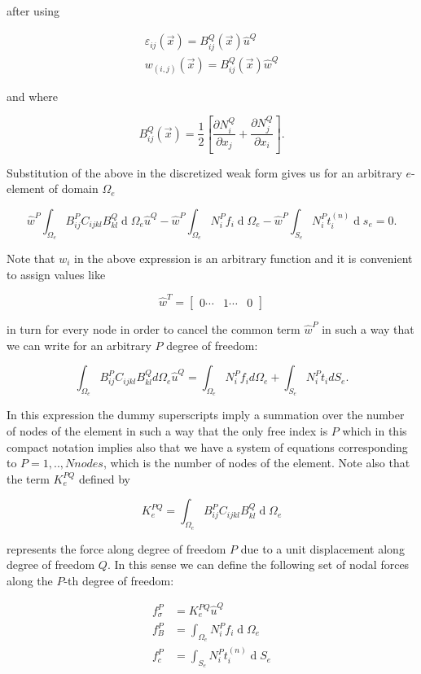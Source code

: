 after using

\begin{align*} 
\varepsilon_{ij}(\overrightarrow x)=B_{ij}^Q(\overrightarrow x)\widehat u^Q \\ 
w_{(i,j)}(\overrightarrow x)=B_{ij}^Q(\overrightarrow x)\widehat w^Q
\end{align*}


and where

\[ B_{ij}^Q(\overrightarrow x)=\frac12\left[\frac{\partial N_i^Q}{\partial x_j}+\frac{\partial N_j^Q}{\partial x_i}\right].\]

Substitution of the above in the discretized weak form gives us for an arbitrary $e$-element of domain $\Omega_e$

\[\widehat w^P\int_{\Omega_e}B_{ij}^PC_{ijkl}B_{kl}^Q\operatorname d\Omega_e\widehat u^Q-\widehat w^P\int_{\Omega_e}N_i^Pf_i\operatorname d\Omega_e-\widehat w^P\int_{S_e}N_i^Pt_i^{(n)}\operatorname ds_e=0.\]


Note that $w_i$ in the above expression is an arbitrary function and it is convenient to assign values like

\[\widehat w^T=\begin{bmatrix}0\cdots&1\cdots&0\end{bmatrix}\]

in turn  for every node in order to cancel the common term $\widehat w^P$ in such a way that we can write for an arbitrary $P$ degree of freedom:

\[\int_{\Omega_e}B_{ij}^PC_{ijkl}B_{kl}^Qd\Omega_e\widehat u^Q=\int_{\Omega_e}N_i^Pf_id\Omega_e+\int_{S_e}N_i^Pt_idS_e.\]

In this expression the dummy superscripts imply a summation over the number of nodes of the element in such a way that the only free index is $P$ which in this compact notation implies also that we have a system of equations corresponding to $P= 1,..,Nnodes$, which is the number of nodes of the element. Note also that the term $K_e^{PQ}$ defined by

\[K_e^{PQ}=\int_{\Omega_e}B_{ij}^PC_{ijkl}B_{kl}^Q\operatorname d\Omega_e\]


represents the force along degree of freedom $P$ due to a unit displacement along degree of freedom $Q$. In this sense we can define the following set of nodal forces along the $P$-th degree of freedom:

\begin{align*} 
f_\sigma^P & =K_e^{PQ}\widehat u^Q \\
f_B^P & =\int_{\Omega_e}N_i^Pf_i\operatorname d\Omega_e \\
f_c^P & =\int_{S_e}N_i^Pt_i^{(n)}\operatorname dS_e
\end{align*}

